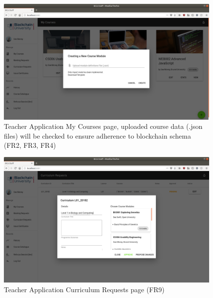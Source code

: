 \begin{figure}[!ht]
	\centering
	\includegraphics[width=1.05\textwidth]{Teacher_createcourse}
	\caption[Teacher Application My Courses page]
	{Teacher Application My Courses page, uploaded course data (.json files) will be 
	checked to ensure adherence to blockchain schema (FR2, FR3, FR4)}
	\label{fig:Teacher_createcourse}
\end{figure}

\begin{figure}[!ht]
	\centering
	\includegraphics[width=1.05\textwidth]{Teacher_approvecurr}
	\caption[Teacher Application Curriculum Requests page]
	{Teacher Application Curriculum Requests page (FR9)}
	\label{fig:Teacher_approvecurr}
\end{figure}

